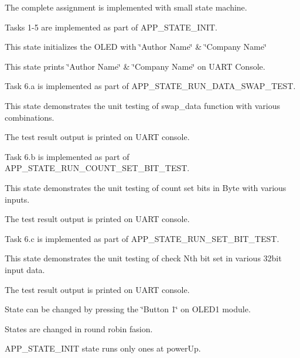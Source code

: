 The complete assignment is implemented with small state machine. \begin{DoxyParagraph}{}
Tasks 1-\/5 are implemented as part of A\-P\-P\-\_\-\-S\-T\-A\-T\-E\-\_\-\-I\-N\-I\-T.
\begin{DoxyItemize}
\item This state initializes the O\-L\-E\-D with \char`\"{}\-Author Name\char`\"{} \& \char`\"{}\-Company Name\char`\"{}
\item This state prints \char`\"{}\-Author Name\char`\"{} \& \char`\"{}\-Company Name\char`\"{} on U\-A\-R\-T Console. 
\end{DoxyItemize}
\end{DoxyParagraph}
\begin{DoxyParagraph}{}
Task 6.\-a is implemented as part of A\-P\-P\-\_\-\-S\-T\-A\-T\-E\-\_\-\-R\-U\-N\-\_\-\-D\-A\-T\-A\-\_\-\-S\-W\-A\-P\-\_\-\-T\-E\-S\-T.
\begin{DoxyItemize}
\item This state demonstrates the unit testing of swap\-\_\-data function with various combinations.
\item The test result output is printed on U\-A\-R\-T console. 
\end{DoxyItemize}
\end{DoxyParagraph}
\begin{DoxyParagraph}{}
Task 6.\-b is implemented as part of A\-P\-P\-\_\-\-S\-T\-A\-T\-E\-\_\-\-R\-U\-N\-\_\-\-C\-O\-U\-N\-T\-\_\-\-S\-E\-T\-\_\-\-B\-I\-T\-\_\-\-T\-E\-S\-T.
\begin{DoxyItemize}
\item This state demonstrates the unit testing of count set bits in Byte with various inputs.
\item The test result output is printed on U\-A\-R\-T console. 
\end{DoxyItemize}
\end{DoxyParagraph}
\begin{DoxyParagraph}{}
Task 6.\-c is implemented as part of A\-P\-P\-\_\-\-S\-T\-A\-T\-E\-\_\-\-R\-U\-N\-\_\-\-S\-E\-T\-\_\-\-B\-I\-T\-\_\-\-T\-E\-S\-T.
\begin{DoxyItemize}
\item This state demonstrates the unit testing of check Nth bit set in various 32bit input data.
\item The test result output is printed on U\-A\-R\-T console. 
\end{DoxyItemize}
\end{DoxyParagraph}
\begin{DoxyParagraph}{}
State can be changed by pressing the \char`\"{}\-Button 1\char`\"{} on O\-L\-E\-D1 module. 
\end{DoxyParagraph}
\begin{DoxyParagraph}{}
States are changed in round robin fasion. 
\end{DoxyParagraph}
\begin{DoxyParagraph}{}
A\-P\-P\-\_\-\-S\-T\-A\-T\-E\-\_\-\-I\-N\-I\-T state runs only ones at power\-Up. 
\end{DoxyParagraph}
